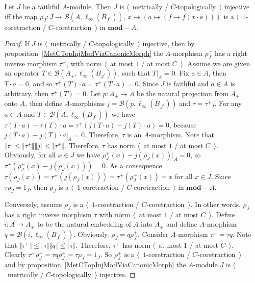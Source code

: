 \begin{proposition}\label{NonDegenMetTopInjCharac}  Let $J$ be a faithful
$A$-module. Then $J$ is $\langle$~metrically / $C$-topologically~$\rangle$
injective iff the map
$\rho_J:J\to\mathcal{B}(A,\ell_\infty(B_{J^*})),\, x\mapsto(a\mapsto(f\mapsto
f(x\cdot a)))$ is a $\langle$~$1$-coretraction / $C$-coretraction~$\rangle$ in
$\mathbf{mod}-A$.
\end{proposition} 
\begin{proof}
If $J$ is $\langle$~metrically / $C$-topologically~$\rangle$ injective, then by
proposition~\ref{MetCTopInjModViaCanonicMorph} the $A$-morphism $\rho_J^+$ has a 
right inverse morphism $\tau^+$, with norm $\langle$~at most $1$ / at most
$C$~$\rangle$. Assume we are given an operator $T\in
\mathcal{B}(A_+,\ell_\infty(B_{J^*}))$, such that $T|_A=0$. Fix $a\in A$, then
$T\cdot a=0$, and so $\tau^+(T)\cdot a=\tau^+(T\cdot a)=0$. Since $J$ is
faithful and $a\in A$ is arbitrary, then $\tau^+(T)=0$. Let $p:A_+\to A$ be
the natural projection from $A_+$ onto $A$, then define $A$-morphisms
$j=\mathcal{B}(p,\ell_\infty(B_{J^*}))$ and $\tau =\tau^+ j$. For any $a\in A$
and $T\in\mathcal{B}(A,\ell_\infty(B_{J^*}))$ 
we have $\tau (T\cdot a)-\tau (T)\cdot a=\tau^+(j(T\cdot a)-j(T)\cdot a)=0$, 
because $j(T\cdot a)-j(T)\cdot a|_A=0$. Therefore, $\tau $ is an $A$-morphism. 
Note that $\Vert\tau \Vert\leq\Vert\tau^+\Vert\Vert j\Vert\leq\Vert\tau^+\Vert$.
Therefore, $\tau$ has norm $\langle$~at most $1$ / at most $C$~$\rangle$. 
Obviously, for all $x\in J$ we have $\rho_J^+(x)-j(\rho_J(x))|_A=0$, 
so $\tau^+(\rho_J^+(x)-j(\rho_J(x)))=0$. 
As a consequence $\tau (\rho_J(x))=\tau^+(j(\rho_J(x)))=\tau^+(\rho_J^+(x))=x$ 
for all $x\in J$. Since $\tau \rho_J=1_J$, then $\rho_J$ 
is a  $\langle$~$1$-coretraction / $C$-coretraction~$\rangle$ 
in $\mathbf{mod}-A$.

Conversely, assume $\rho_J$ is a $\langle$~$1$-coretraction /
$C$-coretraction~$\rangle$. In other words, $\rho_J$ has a right inverse 
morphism $\tau $ with norm $\langle$~at most $1$ / at most $C$~$\rangle$. 
Define $i:A\to A_+$ to be the natural embedding of $A$ into $A_+$ and 
define $A$-morphism $q=\mathcal{B}(i,\ell_\infty(B_{J^*}))$. 
Obviously, $\rho_J=q\rho_J^+$. Consider $A$-morphism $\tau^+=\tau q$. 
Note that $\Vert\tau^+\Vert\leq\Vert\tau \Vert\Vert q\Vert\leq \Vert\tau \Vert$.
Therefore, $\tau^+$ has norm $\langle$~at most $1$ / at most $C$~$\rangle$. 
Clearly $\tau^+\rho_J^+=\tau q\rho_J^+=\tau \rho_J=1_J$. So $\rho_J^+$ 
is a $\langle$~$1$-coretraction / $C$-coretraction~$\rangle$ and by 
proposition~\ref{MetCTopInjModViaCanonicMorph} the $A$-module $J$ is
$\langle$~metrically / $C$-topologically~$\rangle$ injective.
\end{proof}


